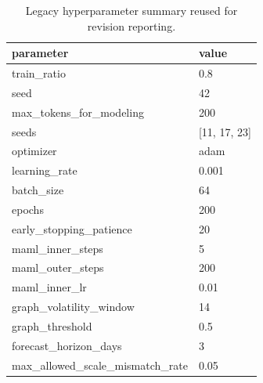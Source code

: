 \begin{table}[htbp]
\centering
\begin{tabular}{ll}
\hline
parameter & value \\
\hline
train_ratio & 0.8 \\
seed & 42 \\
max_tokens_for_modeling & 200 \\
seeds & [11, 17, 23] \\
optimizer & adam \\
learning_rate & 0.001 \\
batch_size & 64 \\
epochs & 200 \\
early_stopping_patience & 20 \\
maml_inner_steps & 5 \\
maml_outer_steps & 200 \\
maml_inner_lr & 0.01 \\
graph_volatility_window & 14 \\
graph_threshold & 0.5 \\
forecast_horizon_days & 3 \\
max_allowed_scale_mismatch_rate & 0.05 \\
\hline
\end{tabular}
\caption{Legacy hyperparameter summary reused for revision reporting.}
\label{table_hyperparameter_best_by_model}
\end{table}